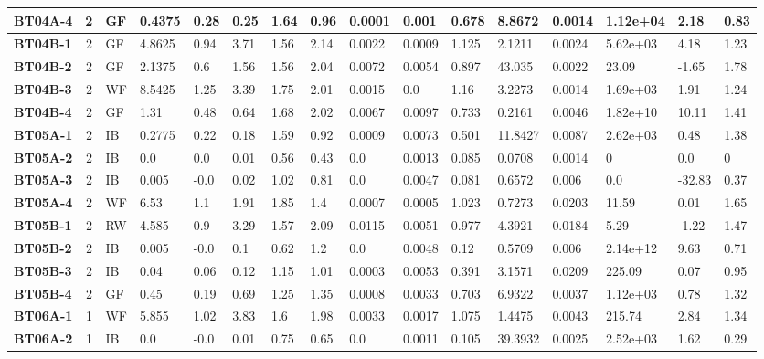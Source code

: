 \begin{table}
{\begin{tabular}{l|c|l|l|l|l|l|l|l|l|l|l|l|l|l|l}
    \bfseries BT04A-4 & 2 & GF & 0.4375 & 0.28 & 0.25 & 1.64 & 0.96 & 0.0001 & 0.001 & 0.678 & 8.8672 & 0.0014 & 1.12e+04 & 2.18 & 0.83 \\
    \hline
    \bfseries BT04B-1 & 2 & GF & 4.8625 & 0.94 & 3.71 & 1.56 & 2.14 & 0.0022 & 0.0009 & 1.125 & 2.1211 & 0.0024 & 5.62e+03 & 4.18 & 1.23 \\
    \bfseries BT04B-2 & 2 & GF & 2.1375 & 0.6 & 1.56 & 1.56 & 2.04 & 0.0072 & 0.0054 & 0.897 & 43.035 & 0.0022 & 23.09 & -1.65 & 1.78 \\
    \bfseries BT04B-3 & 2 & WF & 8.5425 & 1.25 & 3.39 & 1.75 & 2.01 & 0.0015 & 0.0 & 1.16 & 3.2273 & 0.0014 & 1.69e+03 & 1.91 & 1.24 \\
    \bfseries BT04B-4 & 2 & GF & 1.31 & 0.48 & 0.64 & 1.68 & 2.02 & 0.0067 & 0.0097 & 0.733 & 0.2161 & 0.0046 & 1.82e+10 & 10.11 & 1.41 \\
    \hline
    \bfseries BT05A-1 & 2 & IB & 0.2775 & 0.22 & 0.18 & 1.59 & 0.92 & 0.0009 & 0.0073 & 0.501 & 11.8427 & 0.0087 & 2.62e+03 & 0.48 & 1.38 \\
    \bfseries BT05A-2 & 2 & IB & 0.0 & 0.0 & 0.01 & 0.56 & 0.43 & 0.0 & 0.0013 & 0.085 & 0.0708 & 0.0014 & 0 & 0.0 & 0 \\
    \bfseries BT05A-3 & 2 & IB & 0.005 & -0.0 & 0.02 & 1.02 & 0.81 & 0.0 & 0.0047 & 0.081 & 0.6572 & 0.006 & 0.0 & -32.83 & 0.37 \\
    \bfseries BT05A-4 & 2 & WF & 6.53 & 1.1 & 1.91 & 1.85 & 1.4 & 0.0007 & 0.0005 & 1.023 & 0.7273 & 0.0203 & 11.59 & 0.01 & 1.65 \\
    \hline
    \bfseries BT05B-1 & 2 & RW & 4.585 & 0.9 & 3.29 & 1.57 & 2.09 & 0.0115 & 0.0051 & 0.977 & 4.3921 & 0.0184 & 5.29 & -1.22 & 1.47 \\
    \bfseries BT05B-2 & 2 & IB & 0.005 & -0.0 & 0.1 & 0.62 & 1.2 & 0.0 & 0.0048 & 0.12 & 0.5709 & 0.006 & 2.14e+12 & 9.63 & 0.71 \\
    \bfseries BT05B-3 & 2 & IB & 0.04 & 0.06 & 0.12 & 1.15 & 1.01 & 0.0003 & 0.0053 & 0.391 & 3.1571 & 0.0209 & 225.09 & 0.07 & 0.95 \\
    \bfseries BT05B-4 & 2 & GF & 0.45 & 0.19 & 0.69 & 1.25 & 1.35 & 0.0008 & 0.0033 & 0.703 & 6.9322 & 0.0037 & 1.12e+03 & 0.78 & 1.32 \\
    \hline
    \bfseries BT06A-1 & 1 & WF & 5.855 & 1.02 & 3.83 & 1.6 & 1.98 & 0.0033 & 0.0017 & 1.075 & 1.4475 & 0.0043 & 215.74 & 2.84 & 1.34 \\
    \bfseries BT06A-2 & 1 & IB & 0.0 & -0.0 & 0.01 & 0.75 & 0.65 & 0.0 & 0.0011 & 0.105 & 39.3932 & 0.0025 & 2.52e+03 & 1.62 & 0.29 \\

\end{tabular}}
\end{table}
